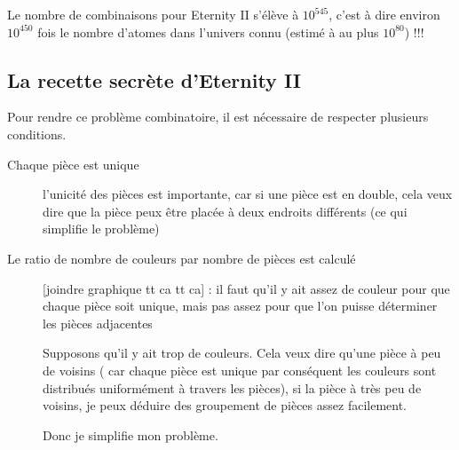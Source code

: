 \documentclass{article}
\begin{document}
	\begin{exmp}
		Le nombre de combinaisons pour Eternity II s'élève à $10^{545}$, c'est à dire environ $10^{450}$ fois le nombre d'atomes dans l'univers connu (estimé à au plus $10^{80}$) !!!
	\end{exmp}
	
	\subsection{La recette secrète d'Eternity II}
	
	Pour rendre ce problème combinatoire, il est nécessaire de respecter plusieurs conditions.
	
	\begin{description}
		\item[Chaque pièce est unique] l'unicité des pièces est importante, car si une pièce est en double, cela veux dire que la pièce peux être placée à deux endroits différents (ce qui simplifie le problème)
		\item[Le ratio de nombre de couleurs par nombre de pièces est calculé] [joindre graphique tt ca tt ca] : il faut qu'il y ait assez de couleur pour que chaque pièce soit unique, mais pas assez pour que l'on puisse déterminer les pièces adjacentes
		
		\begin{exmp}
			Supposons qu'il y ait trop de couleurs. Cela veux dire qu'une pièce à peu de voisins ( car chaque pièce est unique par conséquent les couleurs sont distribués uniformément à travers les pièces), si la pièce à très peu de voisins, je peux déduire des groupement de pièces assez facilement.
			
			Donc je simplifie mon problème.
		\end{exmp}		
	\end{description}
\end{document}
